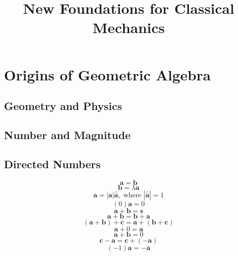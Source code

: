 \documentclass[11pt, a4paper, fleqn]{report}
\title{New Foundations for Classical Mechanics}
\numberwithin{equation}{section}
\begin{document}
\maketitle
\chapter{Origins of Geometric Algebra}
\section{Geometry and Physics}
\section{Number and Magnitude}
\section{Directed Numbers}
\begin{equation}
    \mathbf{a} = \mathbf{b}
\end{equation}
\begin{equation}
    \mathbf{b} = \lambda\mathbf{a}
\end{equation}
\begin{equation}
    \mathbf{a} = |\mathbf{a}|\hat{\mathbf{a}}, \textrm{ where } |\hat{\mathbf{a}}|=1
\end{equation}
\begin{equation}
    (0)\mathbf{a}=0
\end{equation}
\begin{equation}
    \mathbf{a}+\mathbf{b}=\mathbf{s}
\end{equation}
\begin{equation}
    \mathbf{a}+\mathbf{b}=\mathbf{b}+\mathbf{a}
\end{equation}
\begin{equation}
    (\mathbf{a}+\mathbf{b})+\mathbf{c}=\mathbf{a}+(\mathbf{b}+\mathbf{c})
\end{equation}
\begin{equation}
    \mathbf{a}+0=\mathbf{a}
\end{equation}
\begin{equation}
    \mathbf{a}+\mathbf{b}=0
\end{equation}
\begin{equation}
    \mathbf{c}-\mathbf{a}=\mathbf{c}+(-\mathbf{a})
\end{equation}
\begin{equation}
    (-1)\mathbf{a}=-\mathbf{a}
\end{equation}
\end{document}
